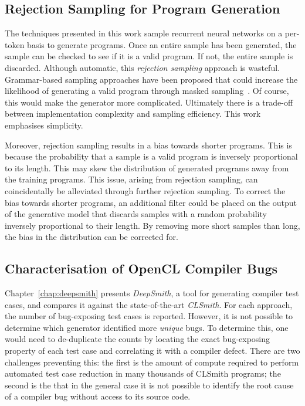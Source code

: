 \subsection{Rejection Sampling for Program Generation}

The techniques presented in this work sample recurrent neural networks on a per-token basis to generate programs. Once an entire sample has been generated, the sample can be checked to see if it is a valid program. If not, the entire sample is discarded. Although automatic, this \emph{rejection sampling} approach is wasteful. Grammar-based sampling approaches have been proposed that could increase the likelihood of generating a valid program through masked sampling~\cite{Dyer2016}. Of course, this would make the generator more complicated. Ultimately there is a trade-off between implementation complexity and sampling efficiency. This work emphasises simplicity.

Moreover, rejection sampling results in a bias towards shorter programs. This is because the probability that a sample is a valid program is inversely proportional to its length. This may skew the distribution of generated programs away from the training programs. This issue, arising from rejection sampling, can coincidentally be alleviated through further rejection sampling. To correct the bias towards shorter programs, an additional filter could be placed on the output of the generative model that discards samples with a random probability inversely proportional to their length. By removing more short samples than long, the bias in the distribution can be corrected for.


\subsection{Characterisation of OpenCL Compiler Bugs}

Chapter~\ref{chap:deepsmith} presents \emph{DeepSmith}, a tool for generating compiler test cases, and compares it against the state-of-the-art \emph{CLSmith}. For each approach, the number of bug-exposing test cases is reported. However, it is not possible to determine which generator identified more \emph{unique} bugs. To determine this, one would need to de-duplicate the counts by locating the exact bug-exposing property of each test case and correlating it with a compiler defect. There are two challenges preventing this: the first is the amount of compute required to perform automated test case reduction in many thousands of CLSmith programs; the second is the that in the general case it is not possible to identify the root cause of a compiler bug without access to its source code.

